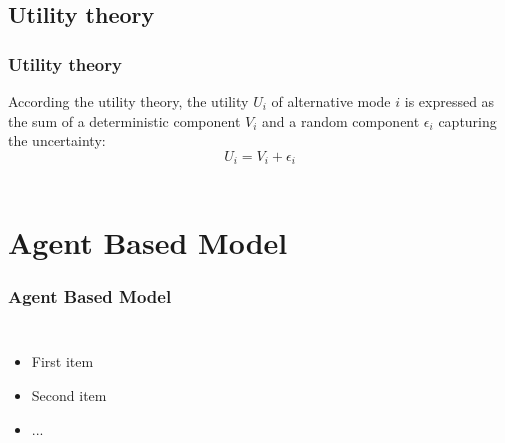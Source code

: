\documentclass[aspectratio=169]{beamer}
\begin{document}
\subsection{Utility theory}

\begin{frame}
  \frametitle{Utility theory}   %
According the utility theory, the utility $U_i$ of alternative mode $i$ is expressed as the sum of a deterministic component $V_i$ and a random component $\epsilon_i$ capturing the uncertainty:
 \begin{equation}
U_i = V_i + \epsilon_i
\end{equation}\\

\end{frame}


\section{Agent Based Model}

\begin{frame}
  \frametitle{Agent Based Model}   %
  \begin{columns}[c]
  \column{2in}  %
  \begin{itemize}
  \item<1-> First item
  \item<2-> Second item
  \item<3-> ...
  \end{itemize}
  \column{2in}
  \end{columns}
\end{frame}
\end{document}
